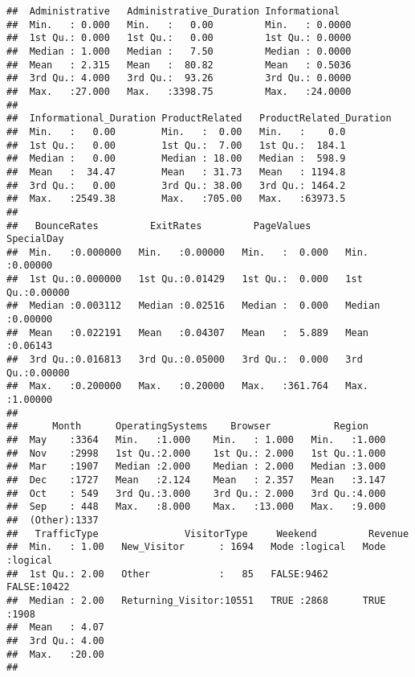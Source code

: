 \documentclass[
]{article}
\begin{document}
\begin{verbatim}
##  Administrative   Administrative_Duration Informational    
##  Min.   : 0.000   Min.   :   0.00         Min.   : 0.0000  
##  1st Qu.: 0.000   1st Qu.:   0.00         1st Qu.: 0.0000  
##  Median : 1.000   Median :   7.50         Median : 0.0000  
##  Mean   : 2.315   Mean   :  80.82         Mean   : 0.5036  
##  3rd Qu.: 4.000   3rd Qu.:  93.26         3rd Qu.: 0.0000  
##  Max.   :27.000   Max.   :3398.75         Max.   :24.0000  
##                                                            
##  Informational_Duration ProductRelated   ProductRelated_Duration
##  Min.   :   0.00        Min.   :  0.00   Min.   :    0.0        
##  1st Qu.:   0.00        1st Qu.:  7.00   1st Qu.:  184.1        
##  Median :   0.00        Median : 18.00   Median :  598.9        
##  Mean   :  34.47        Mean   : 31.73   Mean   : 1194.8        
##  3rd Qu.:   0.00        3rd Qu.: 38.00   3rd Qu.: 1464.2        
##  Max.   :2549.38        Max.   :705.00   Max.   :63973.5        
##                                                                 
##   BounceRates         ExitRates         PageValues        SpecialDay     
##  Min.   :0.000000   Min.   :0.00000   Min.   :  0.000   Min.   :0.00000  
##  1st Qu.:0.000000   1st Qu.:0.01429   1st Qu.:  0.000   1st Qu.:0.00000  
##  Median :0.003112   Median :0.02516   Median :  0.000   Median :0.00000  
##  Mean   :0.022191   Mean   :0.04307   Mean   :  5.889   Mean   :0.06143  
##  3rd Qu.:0.016813   3rd Qu.:0.05000   3rd Qu.:  0.000   3rd Qu.:0.00000  
##  Max.   :0.200000   Max.   :0.20000   Max.   :361.764   Max.   :1.00000  
##                                                                          
##      Month      OperatingSystems    Browser           Region     
##  May    :3364   Min.   :1.000    Min.   : 1.000   Min.   :1.000  
##  Nov    :2998   1st Qu.:2.000    1st Qu.: 2.000   1st Qu.:1.000  
##  Mar    :1907   Median :2.000    Median : 2.000   Median :3.000  
##  Dec    :1727   Mean   :2.124    Mean   : 2.357   Mean   :3.147  
##  Oct    : 549   3rd Qu.:3.000    3rd Qu.: 2.000   3rd Qu.:4.000  
##  Sep    : 448   Max.   :8.000    Max.   :13.000   Max.   :9.000  
##  (Other):1337                                                    
##   TrafficType               VisitorType     Weekend         Revenue       
##  Min.   : 1.00   New_Visitor      : 1694   Mode :logical   Mode :logical  
##  1st Qu.: 2.00   Other            :   85   FALSE:9462      FALSE:10422    
##  Median : 2.00   Returning_Visitor:10551   TRUE :2868      TRUE :1908     
##  Mean   : 4.07                                                            
##  3rd Qu.: 4.00                                                            
##  Max.   :20.00                                                            
## 
\end{verbatim}
\end{document}

